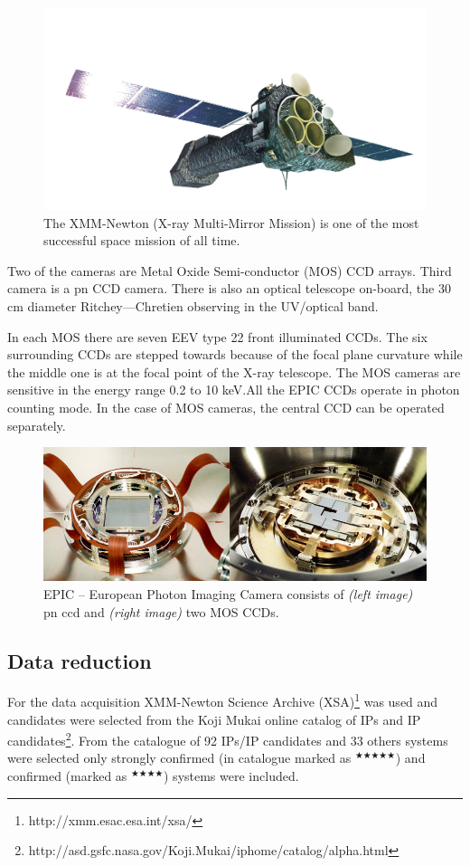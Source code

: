\documentclass[oneside,a4paper,11pt]{report}
\begin{document}
\begin{figure}[!hbt]
\centering
\includegraphics[totalheight=6cm]{XMM}
\caption{The XMM-Newton (X-ray Multi-Mirror Mission) is one of the most successful space mission of all time.}
\label{xmmn1} 
\end{figure}

Two of the cameras are Metal Oxide Semi-conductor (MOS) CCD arrays. Third camera is a pn CCD camera. 
There is also an optical telescope on-board, the 30 cm diameter Ritchey---Chretien observing in the
UV/optical band.  

In each MOS there are seven EEV type 22 front illuminated CCDs. The six surrounding CCDs are 
stepped towards because of the focal plane curvature while the middle one is at the focal point of 
the X-ray telescope. The MOS cameras are sensitive in the energy range 0.2 to 10 keV.All the EPIC CCDs 
operate in photon counting mode. In the case of MOS cameras, the central CCD can be operated separately. 

\begin{figure}[!hbt]
\centering
\includegraphics[totalheight=4cm]{plot/epic}
\caption{EPIC -- European Photon Imaging Camera consists of \textit{(left image)} pn ccd and 
\textit{(right image)} two MOS CCDs.}
\label{xmmn1_epic} 
\end{figure}


\subsection{Data reduction}
For the data acquisition XMM-Newton Science Archive (XSA)\footnote{http://xmm.esac.esa.int/xsa/} was used and
candidates were selected from the Koji Mukai online catalog of IPs and IP candidates\footnote{http://asd.gsfc.nasa.gov/Koji.Mukai/iphome/catalog/alpha.html}.
From the catalogue of 92 IPs/IP candidates and 33 others systems were selected only strongly confirmed 
(in catalogue marked as $^{\bigstar \bigstar \bigstar \bigstar \bigstar}$) 
and confirmed (marked as $^{\bigstar \bigstar \bigstar \bigstar}$) systems were included.
\end{document}
